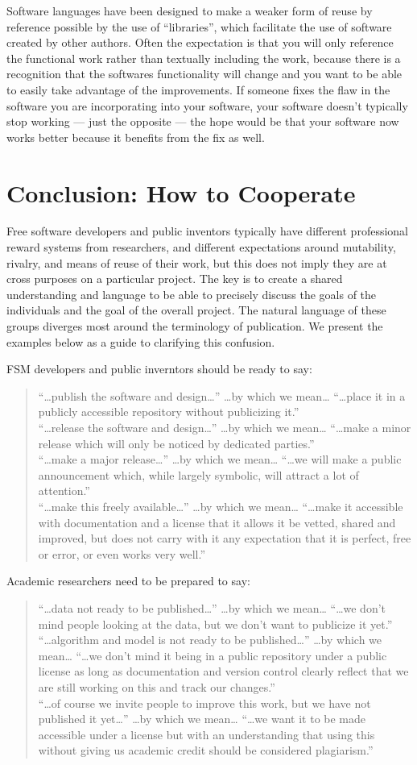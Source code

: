 \documentclass[
	fontsize=10pt, %
	twoside=false, %
	secnumdepth=1, %
]{kaobook}
\begin{document}
Software languages have been designed to make a weaker form of reuse
by reference possible by the use of “libraries”, which facilitate the
use of software created by other authors. Often the expectation is
that you will only reference the functional work rather than textually
including the work, because there is a recognition that the softwares
functionality will change and you want to be able to easily take
advantage of the improvements. If someone fixes the flaw in the
software you are incorporating into your software, your software
doesn’t typically stop working — just the opposite — the hope would be
that your software now works better because it benefits from the fix
as well.

\section{Conclusion: How to Cooperate}
Free software developers and public inventors typically have different
professional reward systems from researchers, and different expectations around mutability,
rivalry, and means of reuse of their work, but this does not imply
they are at cross purposes on a particular project. The key is to
create a shared understanding and language to be able to precisely
discuss the goals of the individuals and the goal of the overall
project. The natural language of these groups diverges most around the
terminology of publication. We present the examples below as a guide
to clarifying this confusion.

FSM developers and public inverntors should be ready to say:
\blockquote{
“…publish the software and design…” …by which we mean… “…place it in a publicly accessible repository without publicizing it.” \\
“…release the software and design…” …by which we mean… “…make a minor release which will only be noticed by dedicated parties.” \\
“…make a major release…” …by which we mean… “…we will make a public announcement which, while largely symbolic, will attract a lot of attention.” \\
“…make this freely available…” …by which we mean… “…make it accessible with documentation and a license that it allows it be vetted, shared and improved, but does not carry with it any expectation that it is perfect, free or error, or even works very well.”
}
Academic researchers need to be prepared to say:
\blockquote{
“…data not ready to be published…” …by which we mean… “…we don’t mind people looking at the data, but we don’t want to publicize it yet.” \\
“…algorithm and model is not ready to be published…” …by which we mean… “…we don’t mind it being in a public repository under a public license as long as documentation and version control clearly reflect that we are still working on this and track our changes.” \\
  “…of course we invite people to improve this work, but we have not published it yet…” …by which we mean… “…we want it to be made accessible under a license but with an understanding that using this without giving us academic credit should be considered plagiarism.” \\
  }
\end{document}
